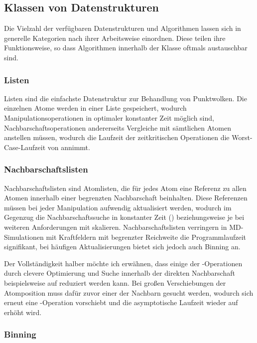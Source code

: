 \subsection{Klassen von Datenstrukturen}

Die Vielzahl der verfügbaren Datenstrukturen und Algorithmen lassen sich in generelle Kategorien nach ihrer Arbeitsweise einordnen.
Diese teilen ihre Funktionsweise, so dass Algorithmen innerhalb der Klasse oftmals austauschbar sind.

\subsubsection{Listen}

Listen sind die einfachste Datenstruktur zur Behandlung von Punktwolken.
Die einzelnen Atome werden in einer Liste gespeichert, wodurch Manipulationsoperationen in optimaler konstanter Zeit möglich sind, Nachbarschaftsoperationen andererseits Vergleiche mit sämtlichen Atomen anstellen müssen, wodurch die Laufzeit der zeitkritischen Operationen die Worst-Case-Laufzeit von  annimmt.

\subsubsection{Nachbarschaftslisten}

Nachbarschaftslisten sind Atomlisten, die für jedes Atom eine Referenz zu allen Atomen innerhalb einer begrenzten Nachbarschaft beinhalten.
Diese Referenzen müssen bei jeder Manipulation aufwendig aktualisiert werden, wodurch im Gegenzug die Nachbarschaftssuche in konstanter Zeit () beziehungsweise je bei weiteren Anforderungen mit  skalieren.
Nachbarschaftslisten verringern in MD-Simulationen mit Kraftfeldern mit begrenzter Reichweite die Programmlaufzeit signifikant, bei häufigen Aktualisierungen bietet sich jedoch auch Binning an.

Der Vollständigkeit halber möchte ich erwähnen, dass einige der -Operationen durch clevere Optimierung und Suche innerhalb der direkten Nachbarschaft beispielsweise auf  reduziert werden kann.
Bei großen Verschiebungen der Atomposition muss dafür zuvor einer der Nachbarn gesucht werden, wodurch sich erneut eine -Operation vorschiebt und die asymptotische Laufzeit wieder auf  erhöht wird.

\subsubsection{Binning}

